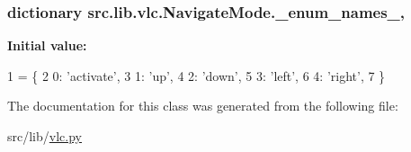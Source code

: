 \subsubsection[{\+\_\+enum\+\_\+names\+\_\+}]{\setlength{\rightskip}{0pt plus 5cm}dictionary src.\+lib.\+vlc.\+Navigate\+Mode.\+\_\+enum\+\_\+names\+\_\+\hspace{0.3cm}{\ttfamily [static]}, {\ttfamily [private]}}\label{classsrc_1_1lib_1_1vlc_1_1NavigateMode_a6bd87d39ccd020c4b4a2e31189764bc5}
{\bfseries Initial value\+:}
\begin{DoxyCode}
1 = \{
2         0: \textcolor{stringliteral}{'activate'},
3         1: \textcolor{stringliteral}{'up'},
4         2: \textcolor{stringliteral}{'down'},
5         3: \textcolor{stringliteral}{'left'},
6         4: \textcolor{stringliteral}{'right'},
7     \}
\end{DoxyCode}


The documentation for this class was generated from the following file\+:\begin{DoxyCompactItemize}
\item 
src/lib/\hyperlink{vlc_8py}{vlc.\+py}\end{DoxyCompactItemize}
